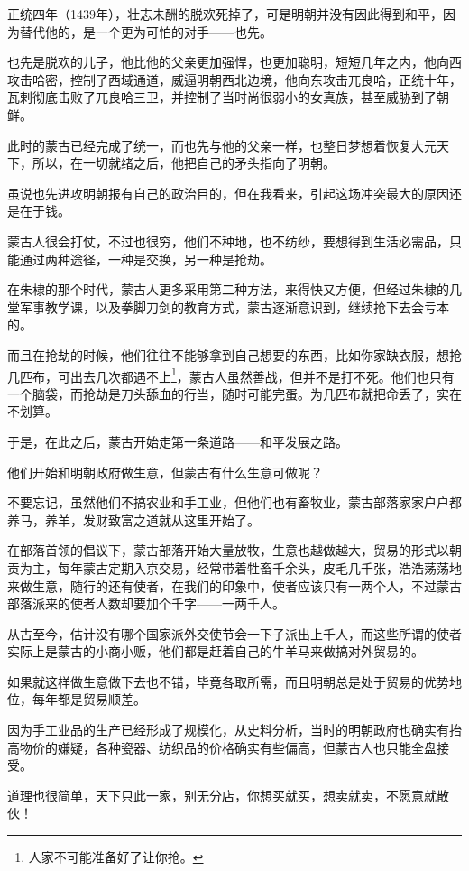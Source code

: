 \begin{multicols}{\theparacolNo}
正统四年（1439年），壮志未酬的脱欢死掉了，可是明朝并没有因此得到和平，因为替代他的，是一个更为可怕的对手——也先。

也先是脱欢的儿子，他比他的父亲更加强悍，也更加聪明，短短几年之内，他向西攻击哈密，控制了西域通道，威逼明朝西北边境，他向东攻击兀良哈，正统十年，瓦剌彻底击败了兀良哈三卫，并控制了当时尚很弱小的女真族，甚至威胁到了朝鲜。

此时的蒙古已经完成了统一，而也先与他的父亲一样，也整日梦想着恢复大元天下，所以，在一切就绪之后，他把自己的矛头指向了明朝。

虽说也先进攻明朝报有自己的政治目的，但在我看来，引起这场冲突最大的原因还是在于钱。

蒙古人很会打仗，不过也很穷，他们不种地，也不纺纱，要想得到生活必需品，只能通过两种途径，一种是交换，另一种是抢劫。

在朱棣的那个时代，蒙古人更多采用第二种方法，来得快又方便，但经过朱棣的几堂军事教学课，以及拳脚刀剑的教育方式，蒙古逐渐意识到，继续抢下去会亏本的。

而且在抢劫的时候，他们往往不能够拿到自己想要的东西，比如你家缺衣服，想抢几匹布，可出去几次都遇不上\footnote{人家不可能准备好了让你抢。}，蒙古人虽然善战，但并不是打不死。他们也只有一个脑袋，而抢劫是刀头舔血的行当，随时可能完蛋。为几匹布就把命丢了，实在不划算。

于是，在此之后，蒙古开始走第一条道路——和平发展之路。

他们开始和明朝政府做生意，但蒙古有什么生意可做呢？

不要忘记，虽然他们不搞农业和手工业，但他们也有畜牧业，蒙古部落家家户户都养马，养羊，发财致富之道就从这里开始了。

在部落首领的倡议下，蒙古部落开始大量放牧，生意也越做越大，贸易的形式以朝贡为主，每年蒙古定期入京交易，经常带着牲畜千余头，皮毛几千张，浩浩荡荡地来做生意，随行的还有使者，在我们的印象中，使者应该只有一两个人，不过蒙古部落派来的使者人数却要加个千字——一两千人。

从古至今，估计没有哪个国家派外交使节会一下子派出上千人，而这些所谓的使者实际上是蒙古的小商小贩，他们都是赶着自己的牛羊马来做搞对外贸易的。

如果就这样做生意做下去也不错，毕竟各取所需，而且明朝总是处于贸易的优势地位，每年都是贸易顺差。

因为手工业品的生产已经形成了规模化，从史料分析，当时的明朝政府也确实有抬高物价的嫌疑，各种瓷器、纺织品的价格确实有些偏高，但蒙古人也只能全盘接受。

道理也很简单，天下只此一家，别无分店，你想买就买，想卖就卖，不愿意就散伙！


\end{multicols}
